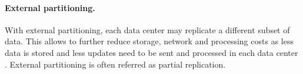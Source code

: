 
\paragraph{External partitioning.}
With external partitioning, each data center may replicate a different subset of data.
This allows to further reduce storage, network and processing costs as less data is stored and less updates need to be sent and processed in each data center \cite{spanner, sipre, practi}.
External partitioning is often referred as partial replication.

